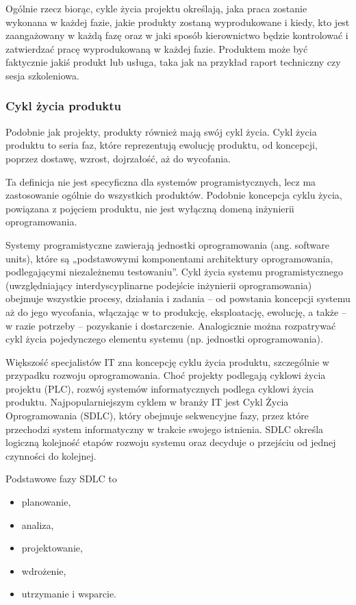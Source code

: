 Ogólnie rzecz biorąc, cykle życia projektu określają, jaka praca zostanie wykonana w każdej fazie, jakie produkty zostaną wyprodukowane i kiedy, kto jest zaangażowany w każdą fazę oraz w jaki sposób kierownictwo będzie kontrolować i zatwierdzać pracę wyprodukowaną w każdej fazie. Produktem może być faktycznie jakiś produkt lub usługa, taka jak na przykład raport techniczny czy sesja szkoleniowa. \autocite{ITPM}

\subsubsection{Cykl życia produktu}
Podobnie jak projekty, produkty również mają swój cykl życia. Cykl życia produktu to seria faz, które reprezentują ewolucję produktu, od koncepcji, poprzez dostawę, wzrost, dojrzałość, aż do wycofania.\autocite{pmbok6}

Ta definicja nie jest specyficzna dla systemów programistycznych, lecz ma zastosowanie ogólnie do wszystkich produktów. Podobnie koncepcja cyklu życia, powiązana z pojęciem produktu, nie jest wyłączną domeną inżynierii oprogramowania.

Systemy programistyczne zawierają jednostki oprogramowania (ang. software units), które są „podstawowymi komponentami architektury oprogramowania, podlegającymi niezależnemu testowaniu”. Cykl życia systemu programistycznego (uwzględniający interdyscyplinarne podejście inżynierii oprogramowania) obejmuje wszystkie procesy, działania i zadania – od powstania koncepcji systemu aż do jego wycofania, włączając w to produkcję, eksploatację, ewolucję, a także – w razie potrzeby – pozyskanie i dostarczenie. Analogicznie można rozpatrywać cykl życia pojedynczego elementu systemu (np. jednostki oprogramowania).\autocite{swebok}

Większość specjalistów IT zna koncepcję cyklu życia produktu, szczególnie
w przypadku rozwoju oprogramowania.\autocite{ITPM} Choć projekty podlegają cyklowi życia projektu (PLC), rozwój systemów informatycznych podlega cyklowi życia produktu. Najpopularniejszym cyklem w branży IT jest Cykl Życia Oprogramowania (SDLC), który obejmuje sekwencyjne fazy, przez które przechodzi system informatyczny w trakcie swojego istnienia.\autocite{ITPMMarchewka} SDLC określa logiczną kolejność etapów rozwoju systemu oraz decyduje o przejściu od jednej czynności do kolejnej\autocite{McConnell}. 

Podstawowe fazy SDLC to
\begin{itemize}
    \item planowanie,
    \item analiza,
    \item projektowanie,
    \item wdrożenie,
    \item utrzymanie i wsparcie.\autocite{ITPMMarchewka}
\end{itemize}

